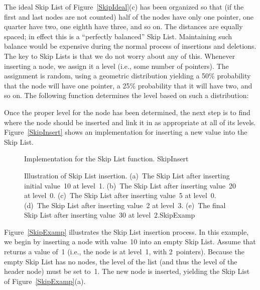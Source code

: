 The ideal Skip List of Figure~\ref{SkipIdeal}(c) has been organized so
that (if the first and last nodes are not counted) half of the nodes
have only one pointer, one quarter have two,
one eighth have three, and so on.
The distances are equally spaced; in effect this is a ``perfectly
balanced'' Skip List.
Maintaining such balance would be expensive during the normal process
of insertions and deletions.
The key to Skip Lists is that we do not worry about any of this.
Whenever inserting a node, we assign it a level (i.e., some number of
pointers).
The assignment is random, using a geometric
distribution yielding
a 50\% probability that the node will have one pointer, a 25\%
probability that it will have two, and so on.
The following function determines the level based on such a
distribution:


\vspace{-\medskipamount}
Once the proper level for the node has been determined, the next
step is to find where the node should be inserted and link it in as
appropriate at all of its levels.
Figure~\ref{SkipInsert} shows an implementation for inserting a new
value into the Skip List.

\begin{figure}
\vspace{-\bigskipamount}
\vspace{-\medskipamount}
{Implementation for the Skip List  function.}
{SkipInsert}
\end{figure}

\begin{figure}
\vspace{-\smallskipamount}
{Illustration of Skip List insertion.
(a)~The Skip List after inserting initial value~10 at level~1.
(b)~The Skip List after inserting value~20 at level~0.
(c)~The Skip List after inserting value~5 at level~0.
(d)~The Skip List after inserting value~2 at level~3.
(e)~The final Skip List after inserting value~30 at
level~2.}{SkipExamp}
\medskip
\end{figure}

Figure~\ref{SkipExamp} illustrates the Skip List insertion process.
In this example, we begin by inserting a node with value~10 into an
empty Skip List.
Assume that  returns a value of~1 (i.e., the node is
at level~1, with 2~pointers).
Because the empty Skip List has no nodes, the level of the list (and
thus the level of the header node) must be set to~1.
The new node is inserted, yielding the Skip List of
Figure~\ref{SkipExamp}(a).

